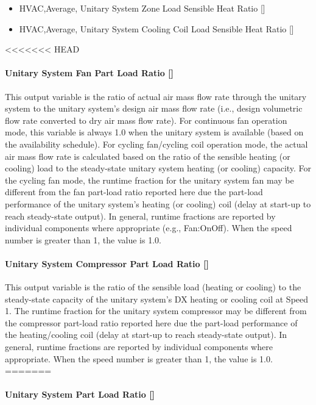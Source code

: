 \begin{itemize}
\item
  HVAC,Average, Unitary System Zone Load Sensible Heat Ratio {[]}
\item
  HVAC,Average, Unitary System Cooling Coil Load Sensible Heat Ratio {[]}
\end{itemize}

<<<<<<< HEAD
\paragraph{Unitary System Fan Part Load Ratio {[]}}\label{unitary-system-fan-part-load-ratio}

This output variable is the ratio of actual air mass flow rate through the unitary system to the unitary system's design air mass flow rate (i.e., design volumetric flow rate converted to dry air mass flow rate). For continuous fan operation mode, this variable is always 1.0 when the unitary system is available (based on the availability schedule). For cycling fan/cycling coil operation mode, the actual air mass flow rate is calculated based on the ratio of the sensible heating (or cooling) load to the steady-state unitary system heating (or cooling) capacity. For the cycling fan mode, the runtime fraction for the unitary system fan may be different from the fan part-load ratio reported here due the part-load performance of the unitary system's heating (or cooling) coil (delay at start-up to reach steady-state output). In general, runtime fractions are reported by individual components where appropriate (e.g., Fan:OnOff). When the speed number is greater than 1, the value is 1.0.

\paragraph{Unitary System Compressor Part Load Ratio {[]}}\label{unitary-system-compressor-part-load-ratio}

This output variable is the ratio of the sensible load (heating or cooling) to the steady-state capacity of the unitary system's DX heating or cooling coil at Speed 1. The runtime fraction for the unitary system compressor may be different from the compressor part-load ratio reported here due the part-load performance of the heating/cooling coil (delay at start-up to reach steady-state output). In general, runtime fractions are reported by individual components where appropriate. When the speed number is greater than 1, the value is 1.0.
=======
\paragraph{Unitary System Part Load Ratio {[]}}\label{unitary-system-part-load-ratio}

